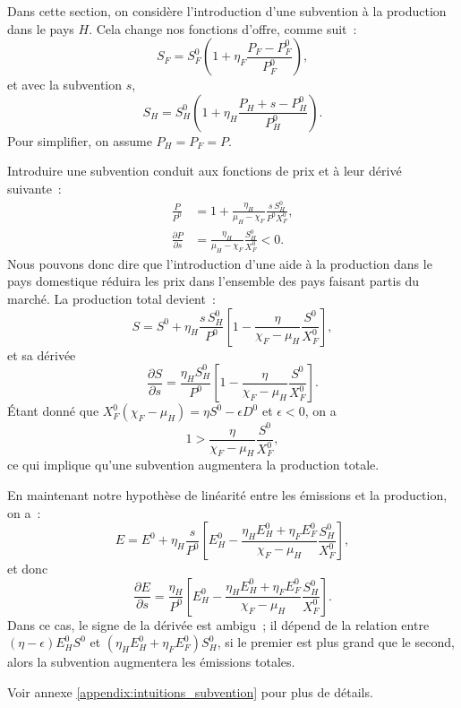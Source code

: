 Dans cette section, on considère l'introduction d'une subvention à la production dans le pays $H$. Cela change nos fonctions d'offre, comme suit~:
$$
    S_F = S_F^0\left(1 + \eta_F\frac{P_F - P_F^0}{P_F^0}\right),
$$
et avec la subvention $s$,
$$
    S_H = S_H^0\left(1 + \eta_H\frac{P_H + s - P_H^0}{P_H^0}\right).
$$
Pour simplifier, on assume $P_H = P_F = P$.

Introduire une subvention conduit aux fonctions de prix et à leur dérivé suivante~:
\begin{align*}
    \frac{P}{P^0}                 & = 1 + \frac{\eta_H}{\mu_H - \chi_F} \frac{s \, S_H^0}{P^0 X_F^0}, \\
    \frac{\partial P}{\partial s} & = \frac{\eta_H}{\mu_H - \chi_F} \frac{S_H^0}{X_F^0} < 0.
\end{align*}
Nous pouvons donc dire que l'introduction d'une aide à la production dans le pays domestique réduira les prix dans l'ensemble des pays faisant partis du marché.
La production total devient~:
$$
    S = S^0 + \eta_H \frac{s \, S_H^0}{P^0}\left[1 - \frac{\eta}{\chi_F - \mu_H}\frac{S^0}{X_F^0}\right],
$$
et sa dérivée
$$
    \frac{\partial S}{\partial s} = \frac{\eta_H S_H^0}{P^0}\left[1 - \frac{\eta}{\chi_F - \mu_H}\frac{S^0}{X_F^0}\right].
$$
Étant donné que $X_F^0(\chi_F - \mu_H) = \eta S^0 - \epsilon D^0$ et $\epsilon < 0$, on a
$$
    1 > \frac{\eta}{\chi_F - \mu_H}\frac{S^0}{X_F^0},
$$
ce qui implique qu'une subvention augmentera la production totale.

En maintenant notre hypothèse de linéarité entre les émissions et la production, on a~:
$$
    E = E^0 + \eta_H \frac{s}{P^0}\left[E_H^0 - \frac{\eta_H E_H^0 + \eta_F E_F^0}{\chi_F - \mu_H}\frac{S_H^0}{X_F^0}\right],
$$
et donc
$$
    \frac{\partial E}{\partial s} = \frac{\eta_H}{P^0}\left[E_H^0 - \frac{\eta_H E_H^0 + \eta_F E_F^0}{\chi_F - \mu_H}\frac{S_H^0}{X_F^0}\right].
$$
Dans ce cas, le signe de la dérivée est ambigu~; il dépend de la relation entre $(\eta - \epsilon)E_H^0 S^0$ et $(\eta_H E_H^0 + \eta_F E_F^0) S_H^0$, si le premier est plus grand que le second, alors la subvention augmentera les émissions totales.

Voir annexe \ref{appendix:intuitions_subvention} pour plus de détails.
